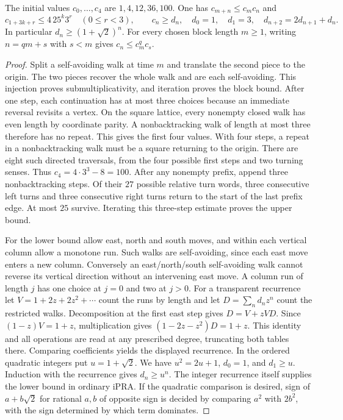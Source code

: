 \begin{theorem}\label{result73}\label{thm:model-saw}
The initial values $c_0,\ldots,c_4$ are $1,4,12,36,100$. One has $c_{m+n}\le c_mc_n$ and
\[
  c_{1+3k+r}\le4\,25^k3^r \quad(0\le r<3),\qquad
  c_n\ge d_n,\quad d_0=1,\quad d_1=3,\quad d_{n+2}=2d_{n+1}+d_n .
\]
In particular $d_n\ge(1+\sqrt2)^n$. For every chosen block length $m\ge1$, writing $n=qm+s$ with $s<m$ gives $c_n\le c_m^q c_s$.
\end{theorem}
\begin{proof}
Split a self-avoiding walk at time $m$ and translate the second piece to the origin. The two pieces recover the whole walk and are each self-avoiding. This injection proves submultiplicativity, and iteration proves the block bound. After one step, each continuation has at most three choices because an immediate reversal revisits a vertex. On the square lattice, every nonempty closed walk has even length by coordinate parity. A nonbacktracking walk of length at most three therefore has no repeat. This gives the first four values. With four steps, a repeat in a nonbacktracking walk must be a square returning to the origin. There are eight such directed traversals, from the four possible first steps and two turning senses. Thus $c_4=4\cdot3^3-8=100$. After any nonempty prefix, append three nonbacktracking steps. Of their $27$ possible relative turn words, three consecutive left turns and three consecutive right turns return to the start of the last prefix edge. At most $25$ survive. Iterating this three-step estimate proves the upper bound.

For the lower bound allow east, north and south moves, and within each vertical column allow a monotone run. Such walks are self-avoiding, since each east move enters a new column. Conversely an east/north/south self-avoiding walk cannot reverse its vertical direction without an intervening east move. A column run of length $j$ has one choice at $j=0$ and two at $j>0$. For a transparent recurrence let $V=1+2z+2z^2+\cdots$ count the runs by length and let $D=\sum_n d_nz^n$ count the restricted walks. Decomposition at the first east step gives $D=V+zVD$. Since $(1-z)V=1+z$, multiplication gives $(1-2z-z^2)D=1+z$. This identity and all operations are read at any prescribed degree, truncating both tables there. Comparing coefficients yields the displayed recurrence. In the ordered quadratic integers put $u=1+\sqrt2$. We have $u^2=2u+1$, $d_0=1$, and $d_1\ge u$. Induction with the recurrence gives $d_n\ge u^n$. The integer recurrence itself supplies the lower bound in ordinary iPRA. If the quadratic comparison is desired, sign of $a+b\sqrt2$ for rational $a,b$ of opposite sign is decided by comparing $a^2$ with $2b^2$, with the sign determined by which term dominates.
\end{proof}

